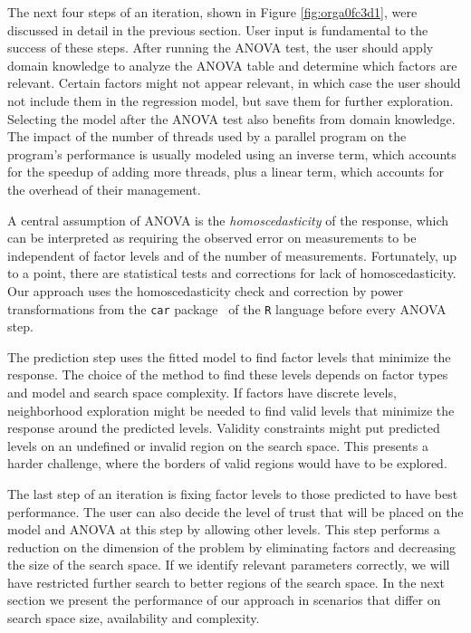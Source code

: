 \documentclass[conference]{IEEEtran}
\begin{document}
The next four steps of an iteration, shown in Figure \ref{fig:orga0fc3d1},
were discussed in detail in the previous section. User input is fundamental to
the success of these steps. After running the ANOVA test, the user should apply
domain knowledge to analyze the ANOVA table and determine which factors are
relevant. Certain factors might not appear relevant, in which case the user
should not include them in the regression model, but save them for further
exploration. Selecting the model after the ANOVA test also benefits from domain
knowledge. The impact of the number of threads used by a parallel program on the
program's performance is usually modeled using an inverse term, which accounts
for the speedup of adding more threads, plus a linear term, which accounts for
the overhead of their management.

A central assumption of ANOVA is the \emph{homoscedasticity} of the response, which
can be interpreted as requiring the observed error on measurements to be
independent of factor levels and of the number of measurements. Fortunately, up
to a point, there are statistical tests and corrections for lack of
homoscedasticity. Our approach uses the homoscedasticity check and correction by
power transformations from the \texttt{car} package~\cite{fox2011car} of the \texttt{R}
language before every ANOVA step.

The prediction step uses the fitted model to find factor levels that minimize
the response. The choice of the method to find these levels depends on factor
types and model and search space complexity. If factors have discrete levels,
neighborhood exploration might be needed to find valid levels that minimize the
response around the predicted levels. Validity constraints might put predicted
levels on an undefined or invalid region on the search space. This presents a
harder challenge, where the borders of valid regions would have to be explored.

The last step of an iteration is fixing factor levels to those predicted to have
best performance. The user can also decide the level of trust that will be
placed on the model and ANOVA at this step by allowing other levels. This step
performs a reduction on the dimension of the problem by eliminating factors and
decreasing the size of the search space. If we identify relevant parameters
correctly, we will have restricted further search to better regions of the
search space. In the next section we present the performance of our approach in
scenarios that differ on search space size, availability and complexity.
\end{document}
